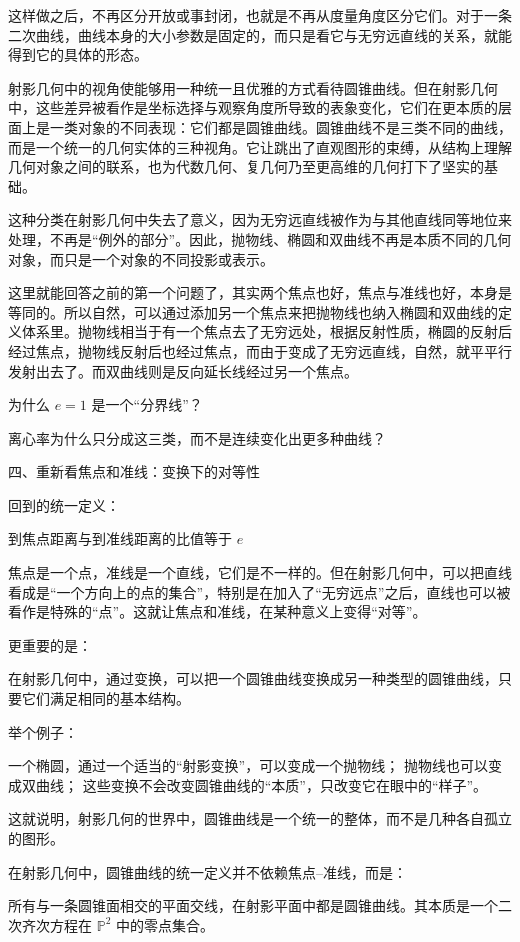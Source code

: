 这样做之后，不再区分开放或事封闭，也就是不再从度量角度区分它们。对于一条二次曲线，曲线本身的大小参数是固定的，而只是看它与无穷远直线的关系，就能得到它的具体的形态。




射影几何中的视角使能够用一种统一且优雅的方式看待圆锥曲线。但在射影几何中，这些差异被看作是坐标选择与观察角度所导致的表象变化，它们在更本质的层面上是一类对象的不同表现：它们都是圆锥曲线。圆锥曲线不是三类不同的曲线，而是一个统一的几何实体的三种视角。它让跳出了直观图形的束缚，从结构上理解几何对象之间的联系，也为代数几何、复几何乃至更高维的几何打下了坚实的基础。

这种分类在射影几何中失去了意义，因为无穷远直线被作为与其他直线同等地位来处理，不再是“例外的部分”。因此，抛物线、椭圆和双曲线不再是本质不同的几何对象，而只是一个对象的不同投影或表示。

这里就能回答之前的第一个问题了，其实两个焦点也好，焦点与准线也好，本身是等同的。所以自然，可以通过添加另一个焦点来把抛物线也纳入椭圆和双曲线的定义体系里。抛物线相当于有一个焦点去了无穷远处，根据反射性质，椭圆的反射后经过焦点，抛物线反射后也经过焦点，而由于变成了无穷远直线，自然，就平平行发射出去了。而双曲线则是反向延长线经过另一个焦点。

为什么 $e=1$ 是一个“分界线”？

离心率为什么只分成这三类，而不是连续变化出更多种曲线？

四、重新看焦点和准线：变换下的对等性

回到的统一定义：

到焦点距离与到准线距离的比值等于 $e$

焦点是一个点，准线是一个直线，它们是不一样的。但在射影几何中，可以把直线看成是“一个方向上的点的集合”，特别是在加入了“无穷远点”之后，直线也可以被看作是特殊的“点”。这就让焦点和准线，在某种意义上变得“对等”。

更重要的是：

在射影几何中，通过变换，可以把一个圆锥曲线变换成另一种类型的圆锥曲线，只要它们满足相同的基本结构。

举个例子：


一个椭圆，通过一个适当的“射影变换”，可以变成一个抛物线；
抛物线也可以变成双曲线；
这些变换不会改变圆锥曲线的“本质”，只改变它在眼中的“样子”。

这就说明，射影几何的世界中，圆锥曲线是一个统一的整体，而不是几种各自孤立的图形。


在射影几何中，圆锥曲线的统一定义并不依赖焦点–准线，而是：

所有与一条圆锥面相交的平面交线，在射影平面中都是圆锥曲线。其本质是一个二次齐次方程在 $\mathbb{P}^2$ 中的零点集合。

